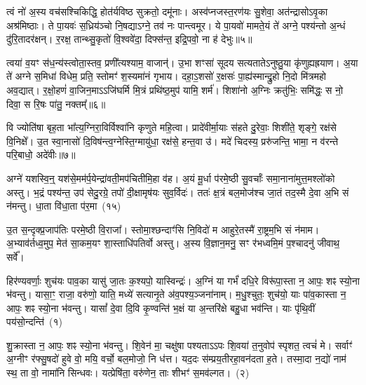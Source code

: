  त्वं नो॑ अ॒स्य वच॑सश्चिकिद्धि॒ होत॑र्यविष्ठ सुक्रतो॒ दमू॑नाः। अस्व॑प्नजस्त॒रण॑यः सु॒शेवा॒ अत॑न्द्रासोऽवृ॒का अश्र॑मिष्ठाः। ते पा॒यवः॑ स॒ध्रिय॑ञ्चो नि॒षद्याऽग्ने॒ तव॑ नः पान्त्वमूर। ये पा॒यवो॑ मामते॒यं ते॑ अग्ने॒ पश्य॑न्तो अ॒न्धं दु॑रि॒तादर॑क्षन्। र॒रक्ष॒ तान्थ्सु॒कृतो॑ वि॒श्ववे॑दा॒ दिफ्स॑न्त॒ इद्रि॒पवो॒ ना ह॑ देभुः॥५॥
 
त्वया॑ व॒यꣳ स॑ध॒न्य॑स्त्वोता॒स्तव॒ प्रणी᳚त्यश्याम॒ वाजान्॑। उ॒भा शꣳसा॑ सूदय सत्यतातेऽनुष्ठु॒या कृ॑णुह्यह्रयाण। अ॒या ते॑ अग्ने स॒मिधा॑ विधेम॒ प्रति॒ स्तोमꣳ॑ श॒स्यमा॑नं गृभाय। दहा॒ऽ॒शसो॑ र॒क्षसः॑ पा॒ह्य॑स्मान्द्रु॒हो नि॒दो मि॑त्रमहो अव॒द्यात्। र॒क्षो॒हणं॑ वा॒जिन॒माऽऽजि॑घर्मि मि॒त्रं प्रथि॑ष्ठ॒मुप॑ यामि॒ शर्म॑। शिशा॑नो अ॒ग्निः क्रतु॑भिः॒ समि॑द्धः॒ स नो॒ दिवा॒ स रि॒षः पा॑तु॒ नक्तम्᳚॥६॥

 वि ज्योति॑षा बृह॒ता भा᳚त्य॒ग्निरा॒विर्विश्वा॑नि कृणुते महि॒त्वा। प्रादे॑वीर्मा॒याः स॑हते दु॒रेवाः॒ शिशी॑ते॒ शृङ्गे॒ रक्ष॑से वि॒निक्षे᳚। उ॒त स्वा॒नासो॑ दि॒विष॑न्त्व॒ग्नेस्ति॒ग्मायु॑धा॒ रक्ष॑से॒ हन्त॒वा उ॑। मदे॑ चिदस्य॒ प्ररु॑जन्ति॒ भामा॒ न व॑रन्ते परि॒बाधो॒ अदे॑वीः॥७॥



अग्ने॑ यशस्वि॒न्॒ यश॑से॒मम॑र्प॒येन्द्रा॑वती॒मप॑चितीमि॒हा व॑ह। अ॒यं मू॒र्धा प॑रमे॒ष्ठी सु॒वर्चाः᳚ समा॒नाना॑मुत्त॒मश्लो॑को अस्तु। भ॒द्रं पश्य॑न्त॒ उप॑ सेदु॒रग्रे॒ तपो॑ दी॒क्षामृष॑यः सुव॒र्विदः॑। ततः॑ क्ष॒त्रं बल॒मोज॑श्च जा॒तं तद॒स्मै दे॒वा अ॒भि सं न॑मन्तु। धा॒ता वि॑धा॒ता प॑र॒मा~(१५)

उ॒त स॒न्दृक्प्र॒जा\-प॑तिः परमे॒ष्ठी वि॒राजा᳚। स्तोमा॒श्छन्दाꣳ॑सि नि॒विदो॑ म आहुरे॒तस्मै॑ रा॒ष्ट्रम॒भि सं न॑माम। अ॒भ्याव॑र्तध्व॒मुप॒ मेत॑ सा॒कम॒यꣳ शा॒स्ताधि॑पतिर्वो अस्तु। अ॒स्य वि॒ज्ञान॒मनु॒ सꣳ र॑भध्वमि॒मं प॒श्चादनु॑ जीवाथ॒ सर्वे᳚। 



हिर॑ण्यवर्णाः॒ शुच॑यः पाव॒का यासु॑ जा॒तः क॒श्यपो॒ यास्विन्द्रः॑। अ॒ग्निं या गर्भं॑ दधि॒रे विरू॑पा॒स्ता न॒ आपः॒ शꣴ स्यो॒ना भ॑वन्तु। यासा॒ꣳ॒ राजा॒ वरु॑णो॒ याति॒ मध्ये॑ सत्यानृ॒ते अ॑व॒पश्य॒ञ्जना॑नाम्। म॒धु॒श्चुतः॒ शुच॑यो॒ याः पा॑व॒कास्ता न॒ आपः॒ शꣴ स्यो॒ना भ॑वन्तु। यासां᳚ दे॒वा दि॒वि कृ॒ण्वन्ति॑ भ॒क्षं या अ॒न्तरि॑क्षे बहु॒धा भव॑न्ति। याः पृ॑थि॒वीं पय॑सो॒न्दन्ति॑~(१)

शु॒क्रास्ता न॒ आपः॒ शꣴ स्यो॒ना भ॑वन्तु। शि॒वेन॑ मा॒ चक्षु॑षा पश्यताऽऽपः शि॒वया॑ त॒नुवोप॑ स्पृशत॒ त्वचं॑ मे। सर्वाꣳ॑ अ॒ग्नीꣳ र॑फ्सु॒षदो॑ हुवे वो॒ मयि॒ वर्चो॒ बल॒मोजो॒ नि ध॑त्त। यद॒दः स॑म्प्रय॒तीरहा॒वन॑दता ह॒ते। तस्मा॒दा न॒द्यो॑ नाम॑ स्थ॒ ता वो॒ नामा॑नि सिन्धवः। यत्प्रेषि॑ता॒ वरु॑णेन॒ ताः शीभꣳ॑ स॒मव॑ल्गत।~(२)

